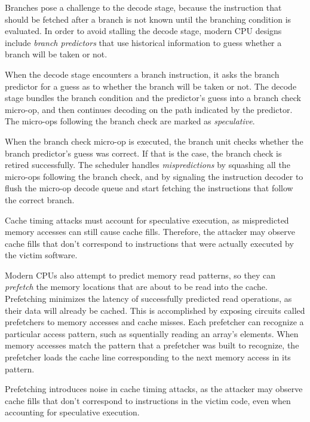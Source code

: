 Branches pose a challenge to the decode stage, because the instruction that
should be fetched after a branch is not known until the branching condition is
evaluated. In order to avoid stalling the decode stage, modern CPU designs
include \textit{branch predictors} that use historical information to guess
whether a branch will be taken or not.

When the decode stage encounters a branch instruction, it asks the branch
predictor for a guess as to whether the branch will be taken or not. The
decode stage bundles the branch condition and the predictor's guess into a
branch check micro-op, and then continues decoding on the path indicated by the
predictor. The micro-ops following the branch check are marked as
\textit{speculative}.

When the branch check micro-op is executed, the branch unit checks whether the
branch predictor's guess was correct. If that is the case, the branch check is
retired successfully. The scheduler handles \textit{mispredictions} by
squashing all the micro-ops following the branch check, and by signaling the
instruction decoder to flush the micro-op decode queue and start fetching the
instructions that follow the correct branch.

Cache timing attacks must account for speculative execution, as mispredicted
memory accesses can still cause cache fills. Therefore, the attacker may
observe cache fills that don't correspond to instructions that were actually
executed by the victim software.


Modern CPUs also attempt to predict memory read patterns, so they can
\textit{prefetch} the memory locations that are about to be read into the
cache. Prefetching minimizes the latency of successfully predicted read
operations, as their data will already be cached. This is accomplished by
exposing circuits called prefetchers to memory accesses and cache misses. Each
prefetcher can recognize a particular access pattern, such as squentially
reading an array's elements. When memory accesses match the pattern that a
prefetcher was built to recognize, the prefetcher loads the cache line
corresponding to the next memory access in its pattern.

Prefetching introduces noise in cache timing attacks, as the attacker may
observe cache fills that don't correspond to instructions in the victim code,
even when accounting for speculative execution.
